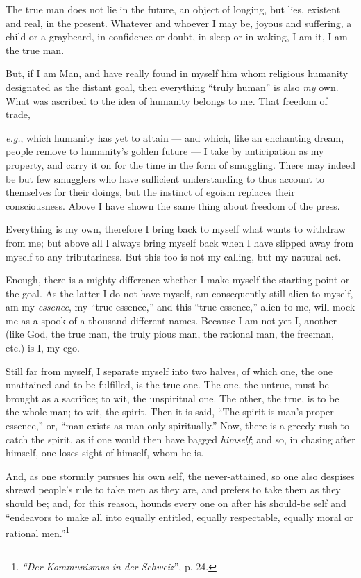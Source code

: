 The true man does not lie in the future, an object of longing, but lies, 
existent and real, in the present. Whatever and whoever I may be, joyous and 
suffering, a child or a graybeard, in confidence or doubt, in sleep or in 
waking, I am it, I am the true man.

But, if I am Man, and have really found in myself him whom religious humanity 
designated as the distant goal, then everything ``truly human'' is also 
\textit{my} own. What was ascribed to the idea of humanity belongs to me. That 
freedom of trade,

\textit{e.g.}, which humanity has yet to attain --- and which, like an 
enchanting dream, people remove to humanity's golden future --- I take by 
anticipation as my property, and carry it on for the time in the form of 
smuggling. There may indeed be but few smugglers who have sufficient 
understanding to thus account to themselves for their doings, but the instinct 
of egoism replaces their consciousness. Above I have shown the same thing 
about freedom of the press.

Everything is my own, therefore I bring back to myself what wants to withdraw 
from me; but above all I always bring myself back when I have slipped away 
from myself to any tributariness. But this too is not my calling, but my 
natural act.

Enough, there is a mighty difference whether I make myself the starting-point 
or the goal. As the latter I do not have myself, am consequently still alien 
to myself, am my \textit{essence}, my ``true essence,'' and this ``true 
essence,'' alien to me, will mock me as a spook of a thousand different 
names. Because I am not yet I, another (like God, the true man, the truly 
pious man, the rational man, the freeman, etc.) is I, my ego.

Still far from myself, I separate myself into two halves, of which one, the 
one unattained and to be fulfilled, is the true one. The one, the untrue, must 
be brought as a sacrifice; to wit, the unspiritual one. The other, the true, 
is to be the whole man; to wit, the spirit. Then it is said, ``The spirit is 
man's proper essence,'' or, ``man exists as man only spiritually.'' Now, 
there is a greedy rush to catch the spirit, as if one would then have bagged 
\textit{himself}; and so, in chasing after himself, one loses sight of 
himself, whom he is.

And, as one stormily pursues his own self, the never-attained, so one also 
despises shrewd people's rule to take men as they are, and prefers to take 
them as they should be; and, for this reason, hounds every one on after his 
should-be self and ``endeavors to make all into equally entitled, equally 
respectable, equally moral or rational men.''\footnote{\textit{``Der 
Kommunismus in der Schweiz}'', p. 24.}

